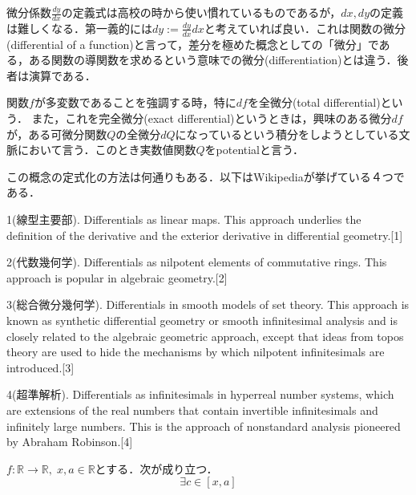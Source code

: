 \documentclass[uplatex, dvipdfmx]{jsreport}
\begin{document}
\begin{remark}
    微分係数$\frac{dy}{dx}$の定義式は高校の時から使い慣れているものであるが，$dx, dy$の定義は難しくなる．第一義的には$dy:=\frac{dy}{dx}dx$と考えていれば良い．これは関数の微分(differential of a function)と言って，差分を極めた概念としての「微分」である，ある関数の導関数を求めるという意味での微分(differentiation)とは違う．後者は演算である．
    
    関数$f$が多変数であることを強調する時，特に$df$を全微分(total differential)という．
    また，これを完全微分(exact differential)というときは，興味のある微分$df$が，ある可微分関数$Q$の全微分$dQ$になっているという積分をしようとしている文脈において言う．このとき実数値関数$Q$をpotentialと言う．

    この概念の定式化の方法は何通りもある．以下はWikipediaが挙げている４つである．

    1(線型主要部). Differentials as linear maps. This approach underlies the definition of the derivative and the exterior derivative in differential geometry.[1]
    
    2(代数幾何学). Differentials as nilpotent elements of commutative rings. This approach is popular in algebraic geometry.[2]

    3(総合微分幾何学). Differentials in smooth models of set theory. This approach is known as synthetic differential geometry or smooth infinitesimal analysis and is closely related to the algebraic geometric approach, except that ideas from topos theory are used to hide the mechanisms by which nilpotent infinitesimals are introduced.[3]

    4(超準解析). Differentials as infinitesimals in hyperreal number systems, which are extensions of the real numbers that contain invertible infinitesimals and infinitely large numbers. This is the approach of nonstandard analysis pioneered by Abraham Robinson.[4]
\end{remark}

\begin{theorem}[多変数のTaylorの定理]
    $f:\mathbb{R}\to\mathbb{R},\; x,a\in\mathbb{R}$とする．次が成り立つ．
    \[ \exists c\in[x,a]  \]
\end{theorem}
\end{document}
